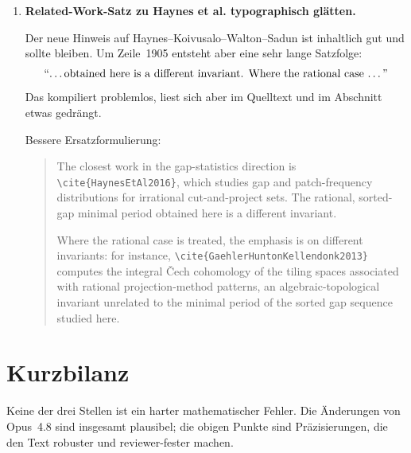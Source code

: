 \documentclass[11pt]{article}
\newcommand{\paperlabel}[1]{\texttt{#1}}
\newcommand{\papercite}[1]{\texttt{\textbackslash cite\{#1\}}}
\begin{document}
\begin{enumerate}[leftmargin=2em]
        Bessere Ersatzformulierung:
        \begin{quote}
        The interval is closed: lattice points lying on either bounding line
        are accepted.  This boundary convention is reflected in the \(+1\) term
        in
        \(N=\lfloor\omega\alpha\rfloor+\lfloor\omega\beta\rfloor+1\), the count
        of admissible levels used in Section~\paperlabel{sec:mainresult}.
        \end{quote}

  \item \textbf{Related-Work-Satz zu Haynes et al. typographisch glätten.}

        Der neue Hinweis auf Haynes--Koivusalo--Walton--Sadun ist inhaltlich
        gut und sollte bleiben.  Um Zeile~1905 entsteht aber eine sehr lange
        Satzfolge:
        \[
          \text{``\dots obtained here is a different invariant. Where the rational case \dots''}
        \]
        Das kompiliert problemlos, liest sich aber im Quelltext und im
        Abschnitt etwas gedrängt.

        Bessere Ersatzformulierung:
        \begin{quote}
        The closest work in the gap-statistics direction is
        \papercite{HaynesEtAl2016}, which studies gap and patch-frequency
        distributions for irrational cut-and-project sets.  The rational,
        sorted-gap minimal period obtained here is a different invariant.

        Where the rational case is treated, the emphasis is on different
        invariants: for instance, \papercite{GaehlerHuntonKellendonk2013}
        computes the integral \v{C}ech cohomology of the tiling spaces
        associated with rational projection-method patterns, an
        algebraic-topological invariant unrelated to the minimal period of the
        sorted gap sequence studied here.
        \end{quote}
\end{enumerate}

\section*{Kurzbilanz}

Keine der drei Stellen ist ein harter mathematischer Fehler.  Die Änderungen
von Opus~4.8 sind insgesamt plausibel; die obigen Punkte sind Präzisierungen,
die den Text robuster und reviewer-fester machen.
\end{document}
